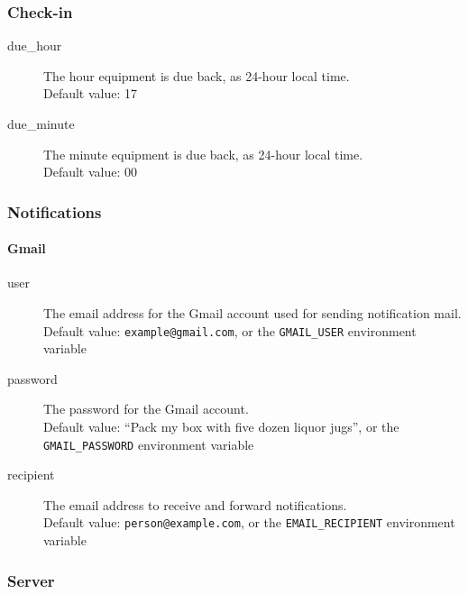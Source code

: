 \subsubsection{Check-in}
\label{subsubsec:server_config_checkin}

\begin{description}
  \item[due\_hour] The hour equipment is due back, as 24-hour local time.\\
    Default value: 17
  \item[due\_minute] The minute equipment is due back, as 24-hour local time.\\
    Default value: 00
\end{description}

\subsubsection{Notifications}
\label{subsubsec:server_config_notifications}

\paragraph{Gmail}
\label{par:gmail_notifications}

\begin{description}
  \item[user] The email address for the Gmail account used for sending notification mail.\\
    Default value: \texttt{example@gmail.com}, or the \texttt{GMAIL\_USER} environment variable
  \item[password] The password for the Gmail account.\\
    Default value: ``Pack my box with five dozen liquor jugs'', or the \texttt{GMAIL\_PASSWORD} environment variable
  \item[recipient] The email address to receive and forward notifications.\\
    Default value: \texttt{person@example.com}, or the \texttt{EMAIL\_RECIPIENT} environment variable
\end{description}

\subsubsection{Server}
\label{subsubsec:server_config_server}

